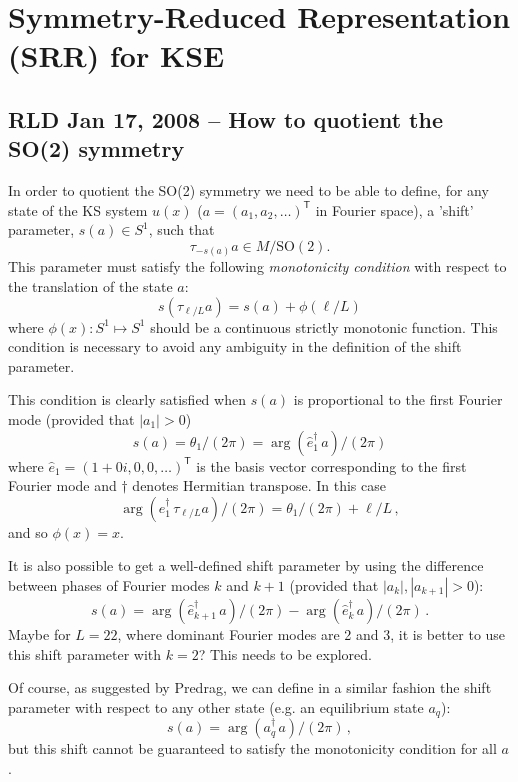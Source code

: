 \documentclass[letter,10pt]{article}
\begin{document}
\section{Symmetry-Reduced Representation (SRR) for KSE}

\subsection{RLD Jan 17, 2008 -- How to quotient the SO(2) symmetry}

In order to quotient the SO(2) symmetry we need to be able to define,
for any state of the KS system $u(x)$
($a = (a_1, a_2, \ldots)^\mathsf{T}$ in Fourier space),
a 'shift' parameter, $s(a) \in S^1 $, such that
\[ \tau_{-s(a)} a \in M/\mathrm{SO}(2). \]
This parameter must satisfy the following {\em monotonicity condition} with
respect to the translation of the state $a$:
\[ s(\tau_{\ell/L}a) = s(a) + \phi(\ell/L) \]
where $\phi(x): S^1 \mapsto S^1$ should be a continuous strictly monotonic function.
This condition is necessary to avoid any ambiguity in the definition of
the shift parameter.

This condition is clearly satisfied when $s(a)$ is proportional to
the first Fourier mode (provided that $|a_1| > 0$)
\begin{equation}
  s(a) =  \theta_1/(2\pi) = \arg(\hat{e}_1^\dagger\,a)/(2\pi)
\label{eq:shift1} \end{equation}
where $\hat{e}_1 = (1+0i, 0, 0, \ldots)^\mathsf{T}$ is the basis vector corresponding
to the first Fourier mode and $\dagger$ denotes Hermitian transpose.
In this case
\[ \arg (e_1^\dagger\,\tau_{\ell/L}a)/(2\pi) = \theta_1/(2\pi) + \ell/L\,, \]
and so $\phi(x) = x$.

It is also possible to get a well-defined shift parameter by
using the difference between phases of Fourier modes $k$ and $k+1$ (provided
that $|a_k|, |a_{k+1}| > 0$):
\begin{equation}
  s(a) = \arg(\hat{e}_{k+1}^\dagger\,a)/(2\pi) -
  \arg(\hat{e}_{k}^\dagger\,a)/(2\pi)\,.
  \label{eq:shiftk} \end{equation}
Maybe for $L = 22$, where dominant Fourier modes are 2 and 3, it is better to use
this shift parameter with $k = 2$?  This needs to be explored.

Of course, as suggested by Predrag, we can define in a similar
fashion the shift parameter with respect to any other
state (e.g. an equilibrium state $a_q$):
\[ s(a) = \arg(a_q^\dagger\, a)/(2\pi)\,, \]
but this shift cannot be guaranteed to satisfy the
monotonicity condition for all $a$.
\end{document}
